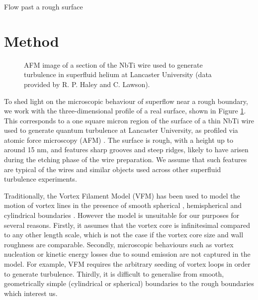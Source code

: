 \begin{chapter}{\label{cha:afm}Flow past a rough surface}
\section{Method\label{section:methodafm}}
\begin{figure}
  \centering
  \caption{\label{fig:afmreal}AFM image of a section of the NbTi wire used to generate turbulence in superfluid helium at Lancaster University (data provided by R. P. Haley and C. Lawson).}
\end{figure}
To shed light on the microscopic behaviour of superflow near a rough
boundary, we work with the three-dimensional profile of a real surface, shown in Figure \ref{fig:afmreal}.  This corresponds to a one square micron region of the surface of a thin NbTi wire used to generate quantum turbulence at Lancaster University, as profiled via atomic force microscopy (AFM) \cite{Lawson}.  The surface is rough, with a height up to around 15 nm, and features sharp grooves and steep ridges, likely to have arisen during the etching phase of the wire preparation. We assume that such features are typical of the wires and similar objects used across other superfluid turbulence experiments. 

Traditionally, the Vortex Filament Model (VFM) \cite{Schwarz}
has been used to model the motion of vortex lines in the presence of
smooth spherical \cite{Hanninen-sphere,Kivotides-sphere},
hemispherical \cite{Schwarz-bump,PhysRevB.50.579} 
and cylindrical boundaries \cite{Hanninen-PNAS,goto08}.
However the model is unsuitable for our purposes for several reasons.
Firstly, it assumes that the vortex core is infinitesimal compared to 
any other length scale, which is not the case if the
vortex core size and wall roughness are comparable.
Secondly, microscopic behaviours such as vortex nucleation or kinetic energy losses due
to sound emission are not captured in the model. For example, VFM requires the arbitrary seeding of
vortex loops in order to generate turbulence.
Thirdly, it is difficult to generalise from smooth, geometrically simple (cylindrical or spherical)
boundaries to the rough boundaries which interest us.


\end{chapter}
